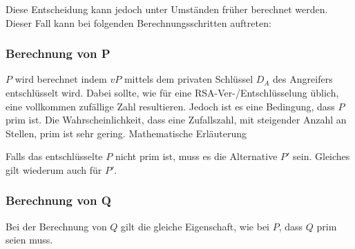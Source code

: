                 Diese Entscheidung kann jedoch unter Umständen früher berechnet werden. Dieser Fall kann bei folgenden Berechnungsschritten  auftreten:

                \subsubsection{Berechnung von P}
                    $P$ wird berechnet indem $vP$ mittels dem privaten Schlüssel $D_{A}$ des Angreifers entschlüsselt wird. Dabei sollte, wie für eine \ac{RSA}-Ver-/Entschlüsselung üblich, eine vollkommen zufällige Zahl resultieren. Jedoch ist es eine Bedingung, dass $P$ prim ist. 
                    Die Wahrscheinlichkeit, dass eine Zufallszahl, mit steigender Anzahl an Stellen, prim ist sehr gering. 
                    Mathematische Erläuterung %

                    Falls das entschlüsselte $P$ nicht prim ist, muss es die Alternative $P'$ sein. Gleiches gilt wiederum auch für $P'$.

                \subsubsection{Berechnung von Q} 
                    Bei der Berechnung von $Q$ gilt die gleiche Eigenschaft, wie bei $P$, dass $Q$ prim seien muss.

